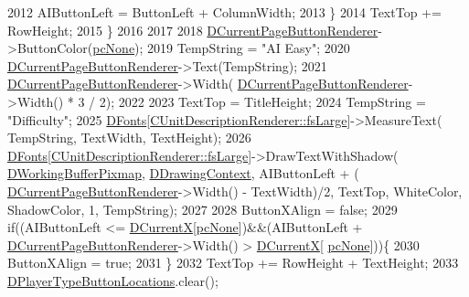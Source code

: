 \begin{DoxyCode}
2012             AIButtonLeft = ButtonLeft + ColumnWidth;
2013         \}
2014         TextTop += RowHeight;
2015     \}
2016     
2017     
2018     \hyperlink{classCApplicationData_abfe1743f2634b069ccc811db4a8733a8}{DCurrentPageButtonRenderer}->ButtonColor(\hyperlink{GameDataTypes_8h_aafb0ca75933357ff28a6d7efbdd7602fa88767aa8e02c7b3192bbab4127b3d729}{pcNone});
2019     TempString = \textcolor{stringliteral}{"AI Easy"};
2020     \hyperlink{classCApplicationData_abfe1743f2634b069ccc811db4a8733a8}{DCurrentPageButtonRenderer}->Text(TempString);   
2021     \hyperlink{classCApplicationData_abfe1743f2634b069ccc811db4a8733a8}{DCurrentPageButtonRenderer}->Width(
      \hyperlink{classCApplicationData_abfe1743f2634b069ccc811db4a8733a8}{DCurrentPageButtonRenderer}->Width() * 3 / 2);
2022     
2023     TextTop = TitleHeight;
2024     TempString = \textcolor{stringliteral}{"Difficulty"};
2025     \hyperlink{classCApplicationData_afde9247d0a3ea87393ec86dcdb1e8274}{DFonts}[\hyperlink{classCUnitDescriptionRenderer_a3ea4cd83b6dd9533ab3abb953a7da35aaf467097fe4f4811a5e2f1959c86e071d}{CUnitDescriptionRenderer::fsLarge}]->MeasureText(
      TempString, TextWidth, TextHeight);
2026     \hyperlink{classCApplicationData_afde9247d0a3ea87393ec86dcdb1e8274}{DFonts}[\hyperlink{classCUnitDescriptionRenderer_a3ea4cd83b6dd9533ab3abb953a7da35aaf467097fe4f4811a5e2f1959c86e071d}{CUnitDescriptionRenderer::fsLarge}]->DrawTextWithShadow(
      \hyperlink{classCApplicationData_afa34cf2780f38dd28c0c811e69d60a97}{DWorkingBufferPixmap}, \hyperlink{classCApplicationData_aa6c5bea9bdcc64398e5a3f693661d37c}{DDrawingContext}, AIButtonLeft + (
      \hyperlink{classCApplicationData_abfe1743f2634b069ccc811db4a8733a8}{DCurrentPageButtonRenderer}->Width() - TextWidth)/2, TextTop, WhiteColor, 
      ShadowColor, 1, TempString);
2027     
2028     ButtonXAlign = \textcolor{keyword}{false};
2029     \textcolor{keywordflow}{if}((AIButtonLeft <= \hyperlink{classCApplicationData_a1dc7ee482a39f7978c71365ac540f97a}{DCurrentX}[\hyperlink{GameDataTypes_8h_aafb0ca75933357ff28a6d7efbdd7602fa88767aa8e02c7b3192bbab4127b3d729}{pcNone}])&&(AIButtonLeft + 
      \hyperlink{classCApplicationData_abfe1743f2634b069ccc811db4a8733a8}{DCurrentPageButtonRenderer}->Width() > \hyperlink{classCApplicationData_a1dc7ee482a39f7978c71365ac540f97a}{DCurrentX}[
      \hyperlink{GameDataTypes_8h_aafb0ca75933357ff28a6d7efbdd7602fa88767aa8e02c7b3192bbab4127b3d729}{pcNone}]))\{
2030         ButtonXAlign = \textcolor{keyword}{true};
2031     \}
2032     TextTop += RowHeight + TextHeight;
2033     \hyperlink{classCApplicationData_a49d2ad6ab469e18577716ac993b475cb}{DPlayerTypeButtonLocations}.clear();

\end{DoxyCode}

